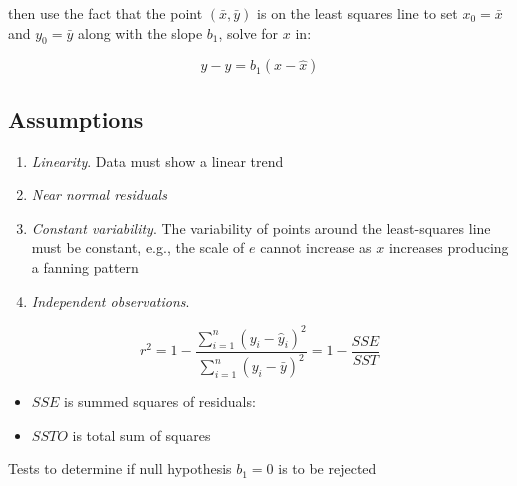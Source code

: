 then use the fact that the point $(\bar{x}, \bar{y})$ is on the least squares line to set $x_0 = \bar{x}$ and $y_0 = \bar{y}$ along with the slope $b_1$, solve for $x$ in:

\begin{equation}
	y - \hat{y} = b_1 (x - \hat{x})
\end{equation}

\subsection*{Assumptions}

\begin{enumerate}
	\item \textit{Linearity}. Data must show a linear trend
	\item \textit{Near normal residuals}
	\item \textit{Constant variability}. The variability of points around the least-squares line must be constant, e.g., the scale of $e$ cannot increase as $x$ increases producing a fanning pattern
	\item \textit{Independent observations}. 
\end{enumerate}

\hformbar




\begin{equation}
	r^2 = 1 - \frac{ \sum_{i=1}^n (y_i - \hat{y}_i)^2 }{ \sum_{i=1}^n (y_i - \bar{y})^2 } = 1 - \frac{SSE}{SST}
\end{equation}

\begin{itemize}
	\item $SSE$ is summed squares of residuals:
	\item $SSTO$ is total sum of squares
\end{itemize}

\hformbar




Tests to determine if null hypothesis $b_1 = 0$ is to be rejected
\hformbar








\newpage
